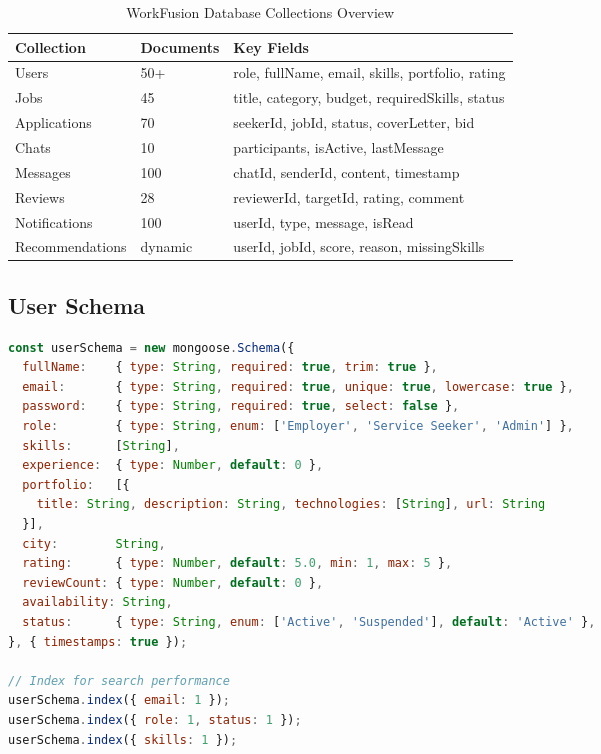 \documentclass[12pt,a4paper,oneside]{report}
\begin{document}
\begin{table}[H]
  \centering
  \caption{WorkFusion Database Collections Overview}
  \label{tab:db-collections}
  \begin{tabularx}{\textwidth}{llX}
    \toprule
    \textbf{Collection} & \textbf{Documents} & \textbf{Key Fields} \\
    \midrule
    Users         & 50+   & role, fullName, email, skills, portfolio, rating \\
    Jobs          & 45    & title, category, budget, requiredSkills, status \\
    Applications  & 70    & seekerId, jobId, status, coverLetter, bid \\
    Chats         & 10    & participants, isActive, lastMessage \\
    Messages      & 100   & chatId, senderId, content, timestamp \\
    Reviews       & 28    & reviewerId, targetId, rating, comment \\
    Notifications & 100   & userId, type, message, isRead \\
    Recommendations & dynamic & userId, jobId, score, reason, missingSkills \\
    \bottomrule
  \end{tabularx}
\end{table}

\subsection{User Schema}

\begin{lstlisting}[language=javascript,caption=User Mongoose Schema]
const userSchema = new mongoose.Schema({
  fullName:    { type: String, required: true, trim: true },
  email:       { type: String, required: true, unique: true, lowercase: true },
  password:    { type: String, required: true, select: false },
  role:        { type: String, enum: ['Employer', 'Service Seeker', 'Admin'] },
  skills:      [String],
  experience:  { type: Number, default: 0 },
  portfolio:   [{
    title: String, description: String, technologies: [String], url: String
  }],
  city:        String,
  rating:      { type: Number, default: 5.0, min: 1, max: 5 },
  reviewCount: { type: Number, default: 0 },
  availability: String,
  status:      { type: String, enum: ['Active', 'Suspended'], default: 'Active' },
}, { timestamps: true });

// Index for search performance
userSchema.index({ email: 1 });
userSchema.index({ role: 1, status: 1 });
userSchema.index({ skills: 1 });
\end{lstlisting}
\end{document}
